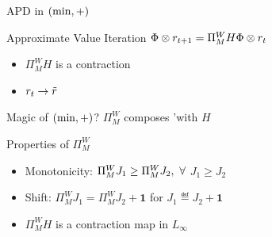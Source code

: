 \documentclass[10pt,handout]{beamer}
\begin{document}
\begin{frame}[fragile]{APD in $(\min,+)$}
\begin{block}{Approximate Value Iteration}
$\Phi \otimes r_{t+1}=\Pi^W_M H \Phi \otimes r_t$
\end{block}
\begin{itemize}
\item $\Pi^W_M H$ is a contraction
\item $r_t \rightarrow \tilde{r}$

\end{itemize}

\begin{block}{Magic of $(\min,+)$?}
{{$\Pi^W_M$ composes {\color{orange}{`nicely}'}with $H$}}
\end{block}
\begin{block}{Properties of $\Pi^W_M$}
\begin{itemize}
\item {Monotonicity:} $\Pi^W_M J_1\geq \Pi^W_M J_2, \mbox{ } \forall$ $J_1\geq J_2$
\item {Shift:} $\Pi^W_M J_1= \Pi^W_M J_2+\mathbf{1}$ for $J_1\eqdef J_2+\mathbf{1}$
\item $\Pi^W_M H$ is a contraction map in $L_\infty$
\end{itemize}
\end{block}



\end{frame}
\end{document}
